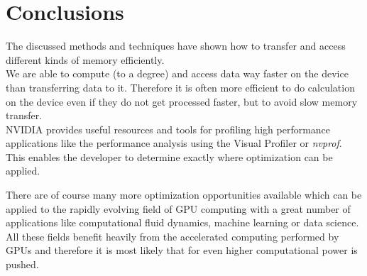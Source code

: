 \section{Conclusions}
\label{sec:concl}
The discussed methods and techniques have shown how to transfer and access different kinds of memory efficiently.\\
We are able to compute (to a degree) and access data way faster on the device than transferring data to it.
Therefore it is often more efficient to do calculation on the device even if they do not get processed faster, but to avoid slow memory transfer.\\
NVIDIA provides useful resources and tools for profiling high performance applications like the performance analysis using the Visual Profiler\cite{visual_profiler} or \emph{nvprof}\cite{nvprof}.
This enables the developer to determine exactly where optimization can be applied.

There are of course many more optimization opportunities available which can be applied to the rapidly evolving field of GPU computing with a great number of applications like computational fluid dynamics\cite{computational_fluid_dynamics}, machine learning\cite{machine_learning} or data science\cite{data_science}.\\
All these fields benefit heavily from the accelerated computing performed by GPUs and therefore it is most likely that for even higher computational power is pushed.\\
